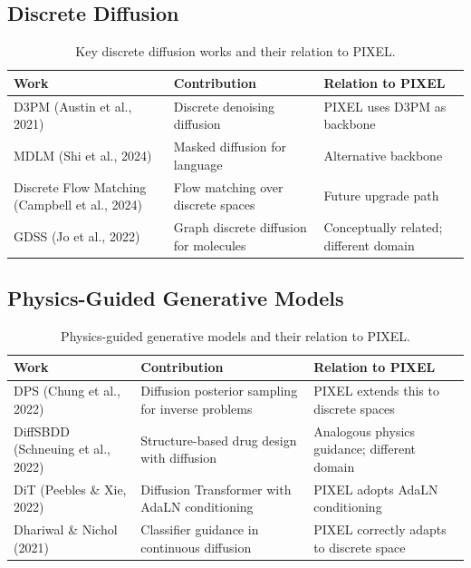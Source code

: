 \documentclass[12pt,a4paper]{article}
\theoremstyle{definition}
\theoremstyle{plain}
\theoremstyle{remark}
\begin{document}
\subsection{Discrete Diffusion}

\begin{table}[H]
\centering
\caption{Key discrete diffusion works and their relation to PIXEL.}
\label{tab:related_diff}
\begin{tabular}{lp{4.5cm}p{4.5cm}}
\toprule
\textbf{Work} & \textbf{Contribution} & \textbf{Relation to PIXEL} \\
\midrule
D3PM (Austin et al., 2021)
  & Discrete denoising diffusion
  & PIXEL uses D3PM as backbone \\
MDLM (Shi et al., 2024)
  & Masked diffusion for language
  & Alternative backbone \\
Discrete Flow Matching (Campbell et al., 2024)
  & Flow matching over discrete spaces
  & Future upgrade path \\
GDSS (Jo et al., 2022)
  & Graph discrete diffusion for molecules
  & Conceptually related; different domain \\
\bottomrule
\end{tabular}
\end{table}

\subsection{Physics-Guided Generative Models}

\begin{table}[H]
\centering
\caption{Physics-guided generative models and their relation to PIXEL.}
\label{tab:related_phys}
\begin{tabular}{lp{4.5cm}p{4.5cm}}
\toprule
\textbf{Work} & \textbf{Contribution} & \textbf{Relation to PIXEL} \\
\midrule
DPS (Chung et al., 2022)
  & Diffusion posterior sampling for inverse problems
  & PIXEL extends this to discrete spaces \\
DiffSBDD (Schneuing et al., 2022)
  & Structure-based drug design with diffusion
  & Analogous physics guidance; different domain \\
DiT (Peebles \& Xie, 2022)
  & Diffusion Transformer with AdaLN conditioning
  & PIXEL adopts AdaLN conditioning \\
Dhariwal \& Nichol (2021)
  & Classifier guidance in continuous diffusion
  & PIXEL correctly adapts to discrete space \\
\bottomrule
\end{tabular}
\end{table}
\end{document}
